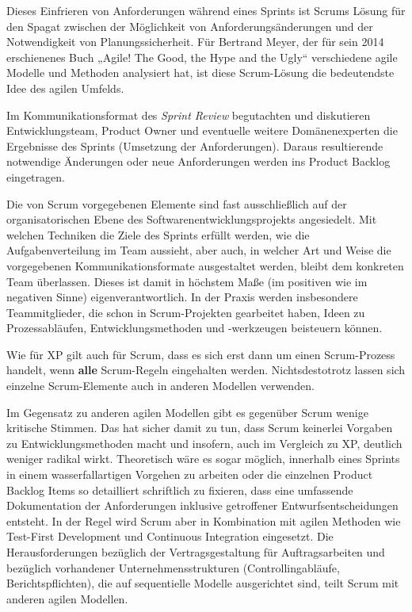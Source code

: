 Dieses Einfrieren von Anforderungen während eines Sprints ist Scrums Lösung für den Spagat zwischen der Möglichkeit von Anforderungsänderungen und der Notwendigkeit von Planungssicherheit. Für Bertrand Meyer, der für sein 2014 erschienenes Buch „Agile! The Good, the Hype and the Ugly“ \cite{mey14} verschiedene agile Mo\-delle und Methoden analysiert hat, ist diese Scrum-Lösung die bedeutendste Idee des agilen Umfelds.

\vspace{3mm} %


\vspace{3mm} %

Im Kommunikationsformat des \textit{Sprint Review}  begutachten und diskutieren Entwicklungsteam, Product Owner und eventuelle weitere Domänenexperten die Ergebnisse des Sprints (Umsetzung der Anforderungen). Daraus resultierende notwendige Änderungen oder neue Anforderungen werden ins Product Backlog eingetragen.


Die von Scrum vorgegebenen Elemente sind fast ausschließlich auf der organisatorischen Ebene des Softwarenentwicklungsprojekts angesiedelt. Mit welchen Techniken die Ziele des Sprints erfüllt werden, wie die Aufgabenverteilung im Team aussieht, aber auch, in welcher Art und Weise die vorgegebenen Kommunikationsformate ausgestaltet werden, bleibt dem konkreten Team überlassen. Dieses ist damit in höchstem Maße (im positiven wie im negativen Sinne) eigenverantwortlich. In der Praxis werden insbesondere Teammitglieder, die schon in Scrum-Projekten gearbeitet haben, Ideen zu Prozessabläufen, Entwicklungsmethoden und -werkzeugen beisteuern können.

Wie für XP gilt auch für Scrum, dass es sich erst dann um einen Scrum-Prozess handelt, wenn \textbf{alle} Scrum-Regeln eingehalten werden. Nichtsdestotrotz lassen sich einzelne Scrum-Elemente auch in anderen Modellen verwenden. 

Im Gegensatz zu anderen agilen Modellen gibt es gegenüber Scrum wenige kritische Stimmen. Das hat sicher damit zu tun, dass Scrum keinerlei Vorgaben zu Entwicklungsmethoden macht und insofern, auch im Vergleich zu XP, deutlich weniger radikal wirkt. Theoretisch wäre es sogar möglich, innerhalb eines Sprints in einem wasserfallartigen Vorgehen zu arbeiten oder die einzelnen Product Backlog Items so detailliert schriftlich zu fixieren, dass eine umfassende Dokumentation der Anforderungen inklusive getroffener Entwurfsentscheidungen entsteht. In der Regel wird Scrum aber in Kombination mit agilen Methoden wie Test-First Development und Continuous Integration eingesetzt. Die Herausforderungen bezüglich der Vertragsgestaltung für Auftragsarbeiten und bezüglich vorhandener Unternehmensstrukturen (\zb Controllingabläufe, Berichtspflichten), die auf sequentielle Modelle ausgerichtet sind, teilt Scrum mit anderen agilen Modellen. 
